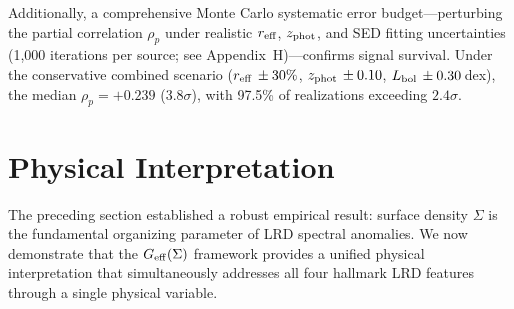 \documentclass[apj,twocolumn,longbibliography,linenumbers]{aastex701}
\begin{document}
\begin{table}[h]
\caption{Robustness Tests (R1--R9)}
\label{tab:robustness}
\centering
\small
{}
\end{table}

Additionally, a comprehensive Monte Carlo systematic error budget---perturbing the partial correlation $\rho_p$ under realistic $r_{\rm eff}$, $z_{\rm phot}$, and SED fitting uncertainties (1,000 iterations per source; see Appendix~H)---confirms signal survival. Under the conservative combined scenario ($r_{\rm eff}\,\pm30\%$, $z_{\rm phot}\,\pm0.10$, $L_{\rm bol}\,\pm0.30$\,dex), the median $\rho_p = +0.239$ ($3.8\sigma$), with 97.5\% of realizations exceeding $2.4\sigma$.


\section{Physical Interpretation}

The preceding section established a robust empirical result: surface density $\Sigma$ is the fundamental organizing parameter of LRD spectral anomalies. We now demonstrate that the $G_{\rm eff}(\Sigma)$ framework provides a unified physical interpretation that simultaneously addresses all four hallmark LRD features through a single physical variable.
\end{document}
